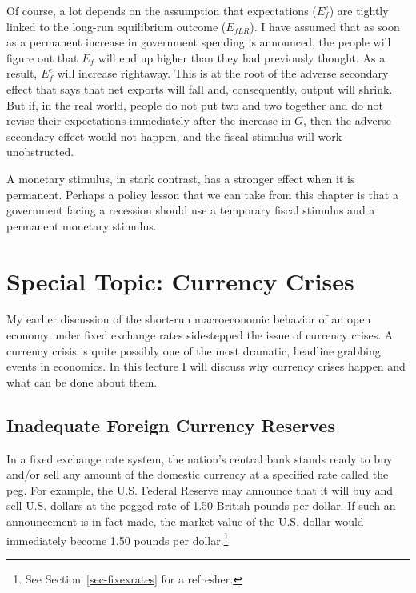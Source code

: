 \documentclass[
  letterpaper,
]{book}
\theoremstyle{plain}
\theoremstyle{remark}
\begin{document}
Of course, a lot depends on the assumption that expectations (\(E_f^e\))
are tightly linked to the long-run equilibrium outcome (\(E_{fLR}\)). I
have assumed that as soon as a permanent increase in government spending
is announced, the people will figure out that \(E_f\) will end up higher
than they had previously thought. As a result, \(E_f^e\) will increase
rightaway. This is at the root of the adverse secondary effect that says
that net exports will fall and, consequently, output will shrink. But
if, in the real world, people do not put two and two together and do not
revise their expectations immediately after the increase in \(G\), then
the adverse secondary effect would not happen, and the fiscal stimulus
will work unobstructed.

A monetary stimulus, in stark contrast, has a stronger effect when it is
permanent. Perhaps a policy lesson that we can take from this chapter is
that a government facing a recession should use a temporary fiscal
stimulus and a permanent monetary stimulus.


\chapter{Special Topic: Currency Crises}\label{sec-crises}

My earlier discussion of the short-run macroeconomic behavior of an open
economy under fixed exchange rates sidestepped the issue of currency
crises. A currency crisis is quite possibly one
of the most dramatic, headline grabbing events in economics. In this
lecture I will discuss why currency crises happen and what can be done
about them.

\section{Inadequate Foreign Currency Reserves}\label{sec-lowreserves}

In a fixed exchange rate system, the nation's central bank stands ready
to buy and/or sell any amount of the domestic currency at a specified
rate called the peg. For example, the U.S. Federal Reserve may announce
that it will buy and sell U.S. dollars at the pegged rate of 1.50
British pounds per dollar. If such an announcement is in fact made, the
market value of the U.S. dollar would immediately become 1.50 pounds per
dollar.\footnote{See Section~\ref{sec-fixexrates} for a refresher.}
\end{document}
